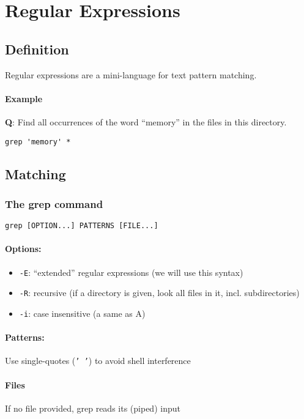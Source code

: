 \documentclass[12pt]{article}
\begin{document}
\newpage
\section{Regular Expressions}
\subsection{Definition}
Regular expressions are a mini-language for text pattern matching.
\paragraph{Example}

\textbf{Q}: Find all occurrences of the word ``memory'' in the files in this directory.

\begin{lstlisting}
grep 'memory' *
\end{lstlisting}

\subsection{Matching}

\subsubsection{The grep command}

\begin{lstlisting}
grep [OPTION...] PATTERNS [FILE...]
\end{lstlisting}

\paragraph{Options:}
\begin{itemize}
    \item \texttt{-E}: ``extended'' regular expressions (we will use this syntax)
    \item \texttt{-R}: recursive (if a directory is given, look all files in it, incl. subdirectories)
    \item \texttt{-i}: case insensitive (a same as A)
\end{itemize}

\paragraph{Patterns:}
Use single-quotes (\texttt{' '}) to avoid shell interference

\paragraph{Files}
If no file provided, grep reads its (piped) input
\end{document}
